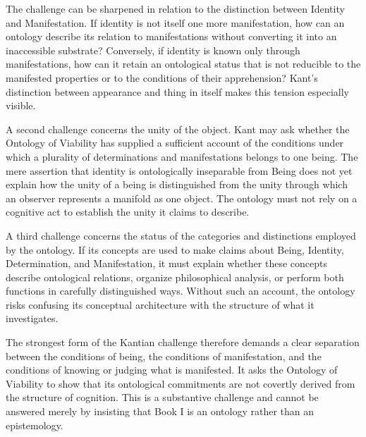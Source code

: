 \label{para:VS.B01.P01.C08.S10.SS13.P002}

The challenge can be sharpened in relation
to the distinction between Identity and
Manifestation. If identity is not itself
one more manifestation, how can an ontology
describe its relation to manifestations
without converting it into an inaccessible
substrate? Conversely, if identity is
known only through manifestations, how
can it retain an ontological status that
is not reducible to the manifested
properties or to the conditions of
their apprehension? Kant's distinction
between appearance and thing in itself
makes this tension especially visible.

\label{para:VS.B01.P01.C08.S10.SS13.P003}

A second challenge concerns the unity of
the object. Kant may ask whether the
Ontology of Viability has supplied a
sufficient account of the conditions
under which a plurality of determinations
and manifestations belongs to one being.
The mere assertion that identity is
ontologically inseparable from Being
does not yet explain how the unity of
a being is distinguished from the unity
through which an observer represents
a manifold as one object. The ontology
must not rely on a cognitive act to
establish the unity it claims to describe.

\label{para:VS.B01.P01.C08.S10.SS13.P004}

A third challenge concerns the status of
the categories and distinctions employed
by the ontology. If its concepts are
used to make claims about Being, Identity,
Determination, and Manifestation, it
must explain whether these concepts
describe ontological relations, organize
philosophical analysis, or perform both
functions in carefully distinguished
ways. Without such an account, the
ontology risks confusing its conceptual
architecture with the structure of
what it investigates.

\label{para:VS.B01.P01.C08.S10.SS13.P005}

The strongest form of the Kantian challenge
therefore demands a clear separation
between the conditions of being, the
conditions of manifestation, and the
conditions of knowing or judging what
is manifested. It asks the Ontology of
Viability to show that its ontological
commitments are not covertly derived
from the structure of cognition. This
is a substantive challenge and cannot
be answered merely by insisting that
Book I is an ontology rather than an
epistemology.


